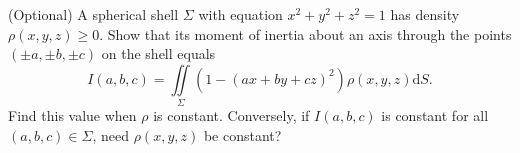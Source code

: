 \documentclass[answers]{exam}
\begin{document}
\begin{questions}



\question%
(Optional) A spherical shell $\Sigma$ with equation $x^{2}+y^{2}+z^{2}=1$ has density $\rho(x, y, z) \geqslant 0$. Show that its moment of inertia about an axis through the points $( \pm a, \pm b, \pm c)$ on the shell equals \[
	I(a, b, c)=\iint\limits_{\Sigma}\left(1-(a x+b y+c z)^{2}\right) \rho(x, y, z) \mathrm{d} S.
\] Find this value when $\rho$ is constant. Conversely, if $I(a, b, c)$ is constant for all $(a, b, c) \in \Sigma$, need $\rho(x, y, z)$ be constant?

\end{questions}
\end{document}
